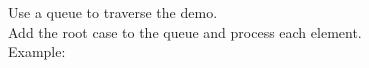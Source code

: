 \documentclass[preview]{standalone}
\begin{document}
Use a queue to traverse the demo.\\Add the root case to the queue and process each element.\\Example:\\
\end{document}
